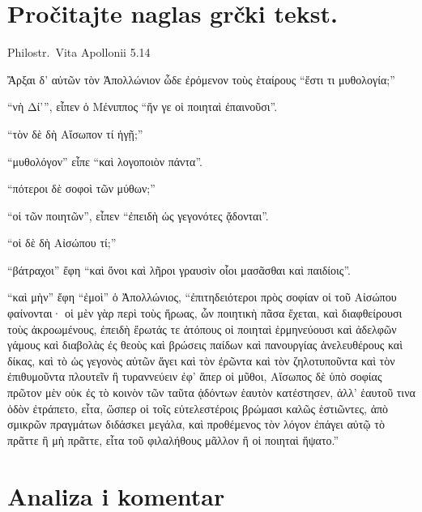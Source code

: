
\section*{Pročitajte naglas grčki tekst.}

Philostr.\ Vita Apollonii 5.14


\medskip

\begin{greek}
{\large
{ \noindent  Ἄρξαι δ' αὐτῶν τὸν Ἀπολλώνιον ὧδε ἐρόμενον τοὺς ἑταίρους ``ἔστι τι μυθολογία;'' 

\noindent ``νὴ Δί'”, εἶπεν ὁ Μένιππος ``ἥν γε οἱ ποιηταὶ ἐπαινοῦσι''. 

\noindent ``τὸν δὲ δὴ Αἴσωπον τί ἡγῇ;'' 

\noindent ``μυθολόγον'' εἶπε ``καὶ λογοποιὸν πάντα''. 

\noindent ``πότεροι δὲ σοφοὶ τῶν μύθων;'' 

\noindent ``οἱ τῶν ποιητῶν'', εἶπεν ``ἐπειδὴ ὡς γεγονότες ᾄδονται''. 

\noindent ``οἱ δὲ δὴ Αἰσώπου τί;'' 

\noindent ``βάτραχοι'' ἔφη ``καὶ ὄνοι καὶ λῆροι γραυσὶν οἷοι μασᾶσθαι καὶ παιδίοις''. 

\noindent ``καὶ μὴν'' ἔφη ``ἐμοὶ'' ὁ Ἀπολλώνιος, ``ἐπιτηδειότεροι πρὸς σοφίαν οἱ τοῦ Αἰσώπου φαίνονται· οἱ μὲν γὰρ περὶ τοὺς ἥρωας, ὧν ποιητικὴ πᾶσα ἔχεται, καὶ διαφθείρουσι τοὺς ἀκροωμένους, ἐπειδὴ ἔρωτάς τε ἀτόπους οἱ ποιηταὶ ἑρμηνεύουσι καὶ ἀδελφῶν γάμους καὶ διαβολὰς ἐς θεοὺς καὶ βρώσεις παίδων καὶ πανουργίας ἀνελευθέρους καὶ δίκας, καὶ τὸ ὡς γεγονὸς αὐτῶν ἄγει καὶ τὸν ἐρῶντα καὶ τὸν ζηλοτυποῦντα καὶ τὸν ἐπιθυμοῦντα πλουτεῖν ἢ τυραννεύειν ἐφ' ἅπερ οἱ μῦθοι, Αἴσωπος δὲ ὑπὸ σοφίας πρῶτον μὲν οὐκ ἐς τὸ κοινὸν τῶν ταῦτα ᾀδόντων ἑαυτὸν κατέστησεν, ἀλλ' ἑαυτοῦ τινα ὁδὸν ἐτράπετο, εἶτα, ὥσπερ οἱ τοῖς εὐτελεστέροις βρώμασι καλῶς ἑστιῶντες, ἀπὸ σμικρῶν πραγμάτων διδάσκει μεγάλα, καὶ προθέμενος τὸν λόγον ἐπάγει αὐτῷ τὸ πρᾶττε ἢ μὴ πρᾶττε, εἶτα τοῦ φιλαλήθους μᾶλλον ἢ οἱ ποιηταὶ ἥψατο.''

}
}
\end{greek}

\section*{Analiza i komentar}


